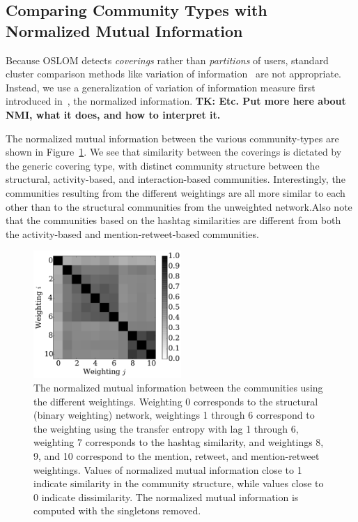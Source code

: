 \subsection{Comparing Community Types with Normalized Mutual Information}

Because OSLOM detects \emph{coverings} rather than \emph{partitions} of users, standard cluster comparison methods like variation of information~\cite{meilua2003comparing} are not appropriate. Instead, we use a generalization of variation of information measure first introduced in~\cite{lancichinetti2009detecting}, the normalized information. \textbf{TK: Etc. Put more here about NMI, what it does, and how to interpret it.}

The normalized mutual information between the various community-types are shown in Figure~\ref{Fig-compare_coverings}. We see that similarity between the coverings is dictated by the generic covering type, with distinct community structure between the structural, activity-based, and interaction-based communities. Interestingly, the communities resulting from the different weightings are all more similar to each other than to the structural communities from the unweighted network.Also note that the communities based on the hashtag similarities are different from both the activity-based and mention-retweet-based communities.

\begin{figure}[h!]
  \centering
\includegraphics[width=0.50\textwidth]{figures/nmi_singletons.pdf}
\caption{The normalized mutual information between the communities using the different weightings. Weighting 0 corresponds to the structural (binary weighting) network, weightings 1 through 6 correspond to the weighting using the transfer entropy with lag 1 through 6, weighting 7 corresponds to the hashtag similarity, and weightings 8, 9, and 10 correspond to the mention, retweet, and mention-retweet weightings. Values of normalized mutual information close to 1 indicate similarity in the community structure, while values close to 0 indicate dissimilarity. The normalized mutual information is computed with the singletons removed.}
\label{Fig-compare_coverings}
\end{figure}

